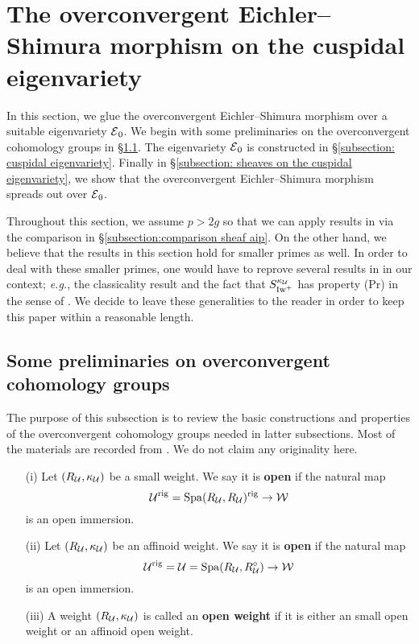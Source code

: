 \section{The overconvergent Eichler--Shimura morphism on the cuspidal eigenvariety }\label{section:oncuspidaleigenvariety}
In this section, we glue the overconvergent Eichler--Shimura morphism over a suitable eigenvariety $\operatorname{\mathcal{E}}_0$. We begin with some preliminaries on the overconvergent cohomology groups in \S \ref{subsection: preliminaries on overconvergent cohomology}. The eigenvariety $\operatorname{\mathcal{E}}_{0}$ is constructed in \S \ref{subsection: cuspidal eigenvariety}. Finally in \S \ref{subsection: sheaves on the cuspidal eigenvariety}, we show that the overconvergent Eichler--Shimura morphism spreads out over $\operatorname{\mathcal{E}}_0$.

Throughout this section, we assume $p>2g$ so that we can apply results in \cite{AIP-2015} via the comparison in \S \ref{subsection:comparison sheaf aip}. On the other hand, we believe that the results in this section hold for smaller primes as well. In order to deal with these smaller primes, one would have to reprove several results in \cite{AIP-2015} in our context; \emph{e.g.}, the classicality result and the fact that $S_{\operatorname{Iw}^+}^{\kappa_{\operatorname{\mathcal{U}}}}$ has property (Pr) in the sense of \cite{Buzzard_2007}. We decide to leave these generalities to the reader in order to keep this paper within a reasonable length.


\subsection{Some preliminaries on overconvergent cohomology groups}\label{subsection: preliminaries on overconvergent cohomology} The purpose of this subsection is to review the basic constructions and properties of the overconvergent cohomology groups needed in latter subsections. Most of the materials are recorded from \cite{Hansen-PhD, CHJ-2017}. We do not claim any originality here. 

\begin{Definition}\label{Definition: open weights}
\begin{enumerate}
    \item[(i)] Let $(R_{\operatorname{\mathcal{U}}}, \kappa_{\operatorname{\mathcal{U}}})$ be a small weight. We say it is \textbf{open} if the natural map \[
        \operatorname{\mathcal{U}}^{\operatorname{rig}} = \operatorname{Spa}(R_{\operatorname{\mathcal{U}}}, R_{\operatorname{\mathcal{U}}})^{\operatorname{rig}} \rightarrow \operatorname{\mathcal{W}}
    \] is an open immersion.
    \item[(ii)] Let $(R_{\operatorname{\mathcal{U}}}, \kappa_{\operatorname{\mathcal{U}}})$ be an affinoid weight. We say it is \textbf{open} if the natural map \[
        \operatorname{\mathcal{U}}^{\operatorname{rig}} = \operatorname{\mathcal{U}} = \operatorname{Spa}(R_{\operatorname{\mathcal{U}}}, R_{\operatorname{\mathcal{U}}}^{\circ}) \rightarrow \operatorname{\mathcal{W}}
    \] is an open immersion. 
    \item[(iii)] A weight $(R_{\operatorname{\mathcal{U}}}, \kappa_{\operatorname{\mathcal{U}}})$ is called an \textbf{open weight} if it is either an small open weight or an affinoid open weight. 
\end{enumerate}
\end{Definition}

